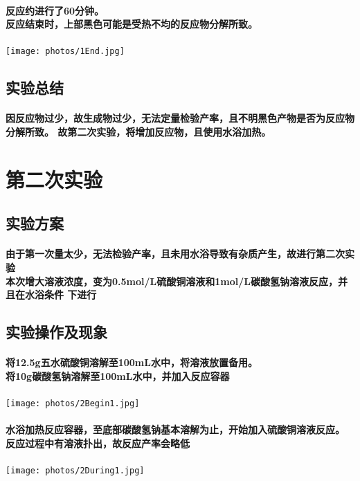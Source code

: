 \documentclass[final,11pt,oneside,UTF8]{report}
\begin{document}
\paragraph{
    反应约进行了60分钟。\\
    反应结束时，上部黑色可能是受热不均的反应物分解所致。\\
}
\begin{center}
    \texttt{[image: photos/1End.jpg]}
\end{center}
\subsection{实验总结}
\paragraph{
    因反应物过少，故生成物过少，无法定量检验产率，且不明黑色产物是否为反应物分解所致。
    故第二次实验，将增加反应物，且使用水浴加热。
}
\section{第二次实验}
\subsection{实验方案}
\paragraph{
    由于第一次量太少，无法检验产率，且未用水浴导致有杂质产生，故进行第二次实验\\
    本次增大溶液浓度，变为0.5mol/L硫酸铜溶液和1mol/L碳酸氢钠溶液反应，并且在水浴条件
    下进行\\
}
\subsection{实验操作及现象}
\paragraph{
    将12.5g五水硫酸铜溶解至100mL水中，将溶液放置备用。\\
    将10g碳酸氢钠溶解至100mL水中，并加入反应容器\\
}
\begin{center}
    \texttt{[image: photos/2Begin1.jpg]}
\end{center}
\paragraph{
    水浴加热反应容器，至底部碳酸氢钠基本溶解为止，开始加入硫酸铜溶液反应。\\
    反应过程中有溶液扑出，故反应产率会略低\\
}
\begin{center}
    \texttt{[image: photos/2During1.jpg]}
\end{center}
\end{document}
